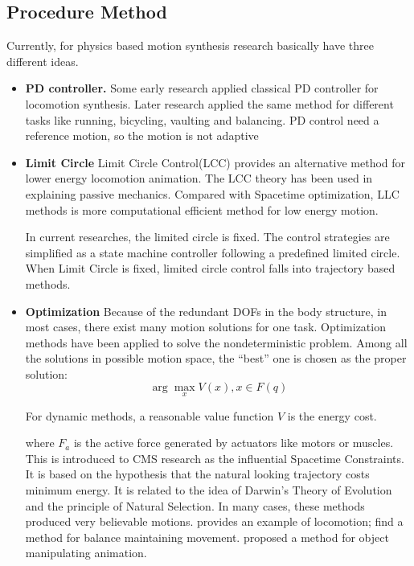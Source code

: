 \subsection*{Procedure Method}
Currently, for physics based motion synthesis research basically have three different ideas.
\begin{itemize}
\item \textbf{PD controller.}
Some early research applied classical PD controller \citep{Raibert1991} for locomotion synthesis.
Later research \citep{Hodgins1995} applied the same method for different tasks like running, bicycling, vaulting and balancing. 
PD control need a reference motion, so the motion is not adaptive


\item \textbf{Limit Circle}
Limit Circle Control(LCC) \citep{Laszlo1996} provides an alternative method for lower energy locomotion animation. 
The LCC theory has been used in explaining passive mechanics.  
Compared with Spacetime optimization, LLC methods is more computational efficient method for low energy motion.

In current researches\citep{Coros2009,Laszlo1996}, the limited circle is fixed.
The control strategies are simplified as a state machine controller following a predefined limited circle.
When Limit Circle is fixed, limited circle control falls into trajectory based methods. 



 


\item \textbf{Optimization}
Because of the redundant DOFs in the body structure, in most cases, there exist many motion solutions for one task.
Optimization methods have been applied to solve the nondeterministic problem. 
Among all the solutions in possible motion space, the ``best'' one is chosen as the proper solution:
\begin{equation}
\label{equ:max_select}
\arg\max_x V(x), x\in F(q)
\end{equation}

For dynamic methods, a reasonable value function $V$ is the energy cost. 

where $F_{a}$ is the active force generated by actuators like motors or muscles. 
This is introduced to CMS research as the influential Spacetime Constraints\citep{Witkin1988}. 
It is based on the hypothesis that the natural looking trajectory costs minimum energy. 
It is related to the idea of Darwin's Theory of Evolution and the principle of Natural Selection. 
In many cases, these methods produced very believable motions. 
\citet{Jain2009} provides an example of locomotion;  
\citet{BalanceControl} find a method for balance maintaining movement. 
\citet{Liu2009} proposed a method for object manipulating animation. 
\end{itemize}

